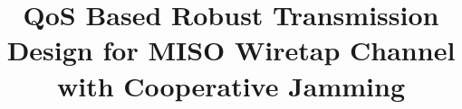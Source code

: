 \documentclass[journal]{IEEEtran}
\begin{document}
%
\title{QoS Based Robust Transmission Design for MISO Wiretap Channel with Cooperative Jamming}



\author{
}


% 
\end{document}
